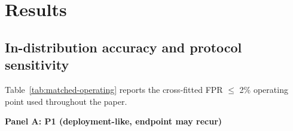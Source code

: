 \documentclass[preprint,11pt]{elsarticle}
\begin{document}
\section{Results}\label{results}

\subsection{In-distribution accuracy and protocol
sensitivity}\label{in-distribution-accuracy-and-protocol-sensitivity}

Table~\ref{tab:matched-operating} reports the cross-fitted FPR $\le$ 2\% operating point used
throughout the paper.



\textbf{Panel A: P1 (deployment-like, endpoint may recur)}
\end{document}
